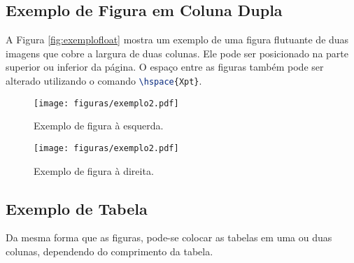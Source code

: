     \subsection{Exemplo de Figura em Coluna Dupla}

    A Figura \ref{fig:exemplofloat} mostra um exemplo de uma figura flutuante de duas imagens que cobre a largura de duas colunas. Ele pode ser posicionado na parte superior ou inferior da página. O espaço entre as figuras também pode ser alterado utilizando o comando \lstinline[language=TeX]|\hspace{Xpt}|.

        \begin{figure*}[t!hb] %
            \centering
            \caption{Exemplo de figura que cobre a largura da página obtida em .}
            \hfill
            \begin{subfigure}[b]{0.38\linewidth}%
                    \texttt{[image: figuras/exemplo2.pdf]}
                    \caption{Exemplo de figura à esquerda.}
                    \label{fig:figa}
            \end{subfigure}
            \hfill %
            \begin{subfigure}[b]{0.38\linewidth}%
                    \centering
                    \texttt{[image: figuras/exemplo2.pdf]}
                    \caption{Exemplo de figura à direita.}
                    \label{fig:figb}
            \end{subfigure}
            \label{fig:exemplofloat}
            \hspace*{\fill}
            
        \end{figure*}
        

   \subsection{Exemplo de Tabela}

        Da mesma forma que as figuras, pode-se colocar as tabelas em uma ou duas colunas, dependendo do comprimento da tabela.

